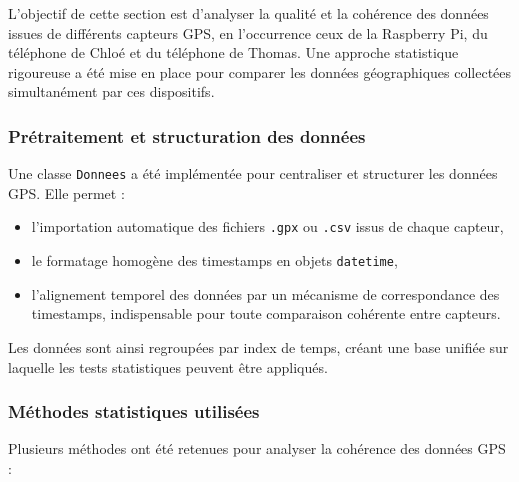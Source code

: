 

L'objectif de cette section est d'analyser la qualité et la cohérence des données issues de différents capteurs GPS, en l'occurrence ceux de la Raspberry Pi, du téléphone de Chloé et du téléphone de Thomas. Une approche statistique rigoureuse a été mise en place pour comparer les données géographiques collectées simultanément par ces dispositifs.

\subsubsection*{Prétraitement et structuration des données}

Une classe \texttt{Donnees} a été implémentée pour centraliser et structurer les données GPS. Elle permet :
\begin{itemize}
    \item l'importation automatique des fichiers \texttt{.gpx} ou \texttt{.csv} issus de chaque capteur,
    \item le formatage homogène des timestamps en objets \texttt{datetime},
    \item l’alignement temporel des données par un mécanisme de correspondance des timestamps, indispensable pour toute comparaison cohérente entre capteurs.
\end{itemize}

Les données sont ainsi regroupées par index de temps, créant une base unifiée sur laquelle les tests statistiques peuvent être appliqués.

\subsubsection*{Méthodes statistiques utilisées}

Plusieurs méthodes ont été retenues pour analyser la cohérence des données GPS :

